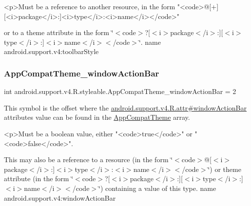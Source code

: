 \begin{DoxyVerb}      <p>Must be a reference to another resource, in the form "<code>@[+][<i>package</i>:]<i>type</i>:<i>name</i></code>"
\end{DoxyVerb}
 or to a theme attribute in the form \char`\"{}$<$code$>$?\mbox{[}$<$i$>$package$<$/i$>$\+:\mbox{]}\mbox{[}$<$i$>$type$<$/i$>$\+:\mbox{]}$<$i$>$name$<$/i$>$$<$/code$>$\char`\"{}.  name android.\+support.\+v4\+:toolbar\+Style \mbox{\label{classandroid_1_1support_1_1v4_1_1R_1_1styleable_a13120c866ad32e1b4339a93a131463d6}} 
\subsubsection{\texorpdfstring{App\+Compat\+Theme\+\_\+window\+Action\+Bar}{AppCompatTheme\_windowActionBar}}
{\footnotesize\ttfamily int android.\+support.\+v4.\+R.\+styleable.\+App\+Compat\+Theme\+\_\+window\+Action\+Bar = 2\hspace{0.3cm}{\ttfamily [static]}}

This symbol is the offset where the \hyperlink{classandroid_1_1support_1_1v4_1_1R_1_1attr_a353d40cb93c69197c58c3f4b7364b41f}{android.\+support.\+v4.\+R.\+attr\#window\+Action\+Bar} attribute\textquotesingle{}s value can be found in the \hyperlink{classandroid_1_1support_1_1v4_1_1R_1_1styleable_ac07ebbe62ed977f6dcaadc6397840ace}{App\+Compat\+Theme} array.

\begin{DoxyVerb}      <p>Must be a boolean value, either "<code>true</code>" or "<code>false</code>".
\end{DoxyVerb}
 

This may also be a reference to a resource (in the form \char`\"{}$<$code$>$@\mbox{[}$<$i$>$package$<$/i$>$\+:\mbox{]}$<$i$>$type$<$/i$>$\+:$<$i$>$name$<$/i$>$$<$/code$>$\char`\"{}) or theme attribute (in the form \char`\"{}$<$code$>$?\mbox{[}$<$i$>$package$<$/i$>$\+:\mbox{]}\mbox{[}$<$i$>$type$<$/i$>$\+:\mbox{]}$<$i$>$name$<$/i$>$$<$/code$>$\char`\"{}) containing a value of this type.  name android.\+support.\+v4\+:window\+Action\+Bar \mbox{\label{classandroid_1_1support_1_1v4_1_1R_1_1styleable_a35dd6a281168ca4263f3a47afa038b5a}} 
